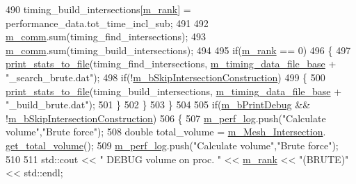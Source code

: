 \begin{DoxyCode}
490             timing\_build\_intersections[\hyperlink{classcarl_1_1_intersection___search_a82564dfb7815673fcb9d9e3eb2d03b97}{m\_rank}] = performance\_data.tot\_time\_incl\_sub;
491 
492             \hyperlink{classcarl_1_1_intersection___search_a69fe381ecd45f4cdcb4810294aa88eaa}{m\_comm}.sum(timing\_find\_intersections);
493             \hyperlink{classcarl_1_1_intersection___search_a69fe381ecd45f4cdcb4810294aa88eaa}{m\_comm}.sum(timing\_build\_intersections);
494 
495             \textcolor{keywordflow}{if}(\hyperlink{classcarl_1_1_intersection___search_a82564dfb7815673fcb9d9e3eb2d03b97}{m\_rank} == 0)
496             \{
497                 \hyperlink{namespacecarl_a87ce5fcb102a26f69dbef740667eb08b}{print\_stats\_to\_file}(timing\_find\_intersections,
      \hyperlink{classcarl_1_1_intersection___search_aea1aa01a86b5cdb7bea5ac9e7f73105f}{m\_timing\_data\_file\_base} + \textcolor{stringliteral}{"\_search\_brute.dat"});
498                 \textcolor{keywordflow}{if}(!\hyperlink{classcarl_1_1_intersection___search_aef626956ac007f4c737aba3f2f69f2de}{m\_bSkipIntersectionConstruction})
499                 \{
500                     \hyperlink{namespacecarl_a87ce5fcb102a26f69dbef740667eb08b}{print\_stats\_to\_file}(timing\_build\_intersections,
      \hyperlink{classcarl_1_1_intersection___search_aea1aa01a86b5cdb7bea5ac9e7f73105f}{m\_timing\_data\_file\_base} + \textcolor{stringliteral}{"\_build\_brute.dat"});
501                 \}
502             \}
503         \}
504 
505         \textcolor{keywordflow}{if}(\hyperlink{classcarl_1_1_intersection___search_af69485e014f8178ec6c6dcbd95bf9dc9}{m\_bPrintDebug} && !\hyperlink{classcarl_1_1_intersection___search_aef626956ac007f4c737aba3f2f69f2de}{m\_bSkipIntersectionConstruction})
506         \{
507             \hyperlink{classcarl_1_1_intersection___search_aebe6210287a36909206b1a59f9cd17e0}{m\_perf\_log}.push(\textcolor{stringliteral}{"Calculate volume"},\textcolor{stringliteral}{"Brute force"});
508             \textcolor{keywordtype}{double} total\_volume = \hyperlink{classcarl_1_1_intersection___search_a4946b764d66e3f26f323c5d043551c66}{m\_Mesh\_Intersection}.
      \hyperlink{classcarl_1_1_mesh___intersection_a67f126ec639724230b32916b59af4933}{get\_total\_volume}();
509             \hyperlink{classcarl_1_1_intersection___search_aebe6210287a36909206b1a59f9cd17e0}{m\_perf\_log}.push(\textcolor{stringliteral}{"Calculate volume"},\textcolor{stringliteral}{"Brute force"});
510 
511             std::cout << \textcolor{stringliteral}{"    DEBUG volume on proc. "} << \hyperlink{classcarl_1_1_intersection___search_a82564dfb7815673fcb9d9e3eb2d03b97}{m\_rank} << \textcolor{stringliteral}{"(BRUTE)"} << std::endl;

\end{DoxyCode}
